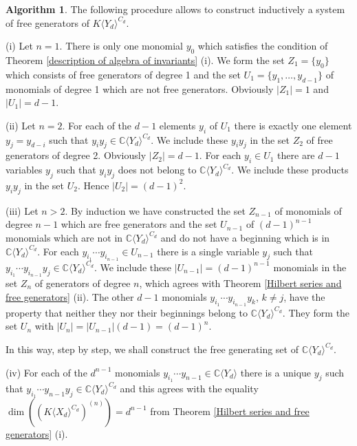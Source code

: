 \documentclass{amsart}
\theoremstyle{definition}
\newtheorem{algorithm}[theorem]{Algorithm}
\begin{document}
\begin{algorithm}\label{algorithm}
The following procedure allows to construct inductively a system of free generators of $K\langle Y_d\rangle^{C_d}$.

(i) Let $n=1$. There is only one monomial $y_0$ which satisfies the condition of Theorem \ref{description of algebra of invariants} (i).
We form the set $Z_1=\{y_0\}$ which consists of free generators of degree 1 and the set $U_1=\{y_1,\ldots,y_{d-1}\}$ of monomials of degree 1 which are not free generators.
Obviously $\vert Z_1\vert=1$ and $\vert U_1\vert=d-1$.

(ii) Let $n=2$. For each of the $d-1$ elements $y_i$ of $U_1$ there is exactly one element $y_j=y_{d-i}$ such that $y_iy_j\in {\mathbb C}\langle Y_d\rangle^{C_d}$.
We include these $y_iy_j$ in the set $Z_2$ of free generators of degree 2. Obviously $\vert Z_2\vert=d-1$. For each $y_i\in U_1$ there are $d-1$ variables $y_j$
such that $y_iy_j$ does not belong to ${\mathbb C}\langle Y_d\rangle^{C_d}$. We include these products $y_iy_j$ in the set $U_2$. Hence $\vert U_2\vert=(d-1)^2$.

(iii) Let $n>2$. By induction we have constructed the set $Z_{n-1}$ of monomials of degree $n-1$ which are free generators and the set $U_{n-1}$ of $(d-1)^{n-1}$ monomials
which are not in ${\mathbb C}\langle Y_d\rangle^{C_d}$ and do not have a beginning which is in ${\mathbb C}\langle Y_d\rangle^{C_d}$.
For each $y_{i_1}\cdots y_{i_{n-1}}\in U_{n-1}$ there is a single variable $y_j$ such that $y_{i_1}\cdots y_{i_{n-1}}y_j\in {\mathbb C}\langle Y_d\rangle^{C_d}$. We include these
$\vert U_{n-1}\vert=(d-1)^{n-1}$ monomials in the set $Z_n$ of generators of degree $n$, which agrees with Theorem \ref{Hilbert series and free generators} (ii).
The other $d-1$ monomials $y_{i_1}\cdots y_{i_{n-1}}y_k$, $k\not=j$,
have the property that neither they nor their beginnings belong to ${\mathbb C}\langle Y_d\rangle^{C_d}$. They form the set $U_n$ with $\vert U_n\vert=\vert U_{n-1}\vert(d-1)=(d-1)^n$.

In this way, step by step, we shall construct the free generating set of ${\mathbb C}\langle Y_d\rangle^{C_d}$.

(iv) For each of the $d^{n-1}$ monomials $y_{i_1}\cdots y_{n-1}\in {\mathbb C}\langle Y_d\rangle$ there is a unique $y_j$ such that $y_{i_1}\cdots y_{n-1}y_j\in {\mathbb C}\langle Y_d\rangle^{C_d}$
and this agrees with the equality $\dim\left((K\langle X_d\rangle^{C_d})^{(n)}\right)=d^{n-1}$ from Theorem \ref{Hilbert series and free generators} (i).
\end{algorithm}
\end{document}
